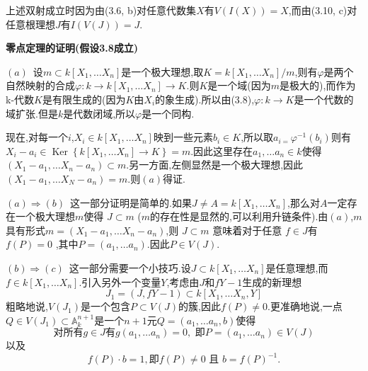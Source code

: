\documentclass[UTF8]{book}
\begin{document}
		
		上述双射成立时因为由(3.6, b)对任意代数集$ X $有$ V(I(X))  = X$,而由(3.10, c)对任意根理想$ J $有$ I(V(J))  = J$.
		
		
		\textbf{零点定理的证明(假设3.8成立)}
		
		
		$ (a) $\ 设$m \subset k \left[ X _{1}, \ldots X _{ n }\right]$是一个极大理想,取$K = k \left[ X _{1}, \ldots X _{ n }\right] / m$,则有$ \varphi $是两个自然映射的合成$ \varphi : k \to k \left[ X _{1}, \ldots X _{ n }\right] \to K$.则$ K $是一个域(因为$ m $是极大的),而作为k-代数$ K $是有限生成的(因为$ K $由$ X_{i} $的象生成).所以由(3.8),$ \varphi : k \to K $是一个代数的域扩张.但是$ k $是代数闭域,所以$ \varphi $是一个同构.
		
		
		现在,对每一个$ i $,$X _{ i } \in k \left[ X _{1}, \ldots X _{ n }\right]$映到一些元素$ b_{i} \in K$,所以取$a _{ i =} \varphi^{-1}\left(b _{ i }\right)$则有$X _{ i }- a _{ i } \in \operatorname{Ker}\left\{ k \left[ X _{1}, \ldots X _{ n }\right] \rightarrow K \right\}= m .$因此这里存在$a _{1}, \ldots a _{ n } \in k$使得$\left(X _{1}- a _{1}, \ldots X _{ n }- a _{ n }\right) \subset m .$另一方面,左侧显然是一个极大理想,因此$\left(X _{1}- a _{1}, \ldots X _{ N }- a _{ n }\right)= m .$则$ (a) $得证.
		
		
		$ (a)  \Rightarrow (b) $\ 这一部分证明是简单的.如果$J \neq A = k \left[ X _{1}, \ldots X _{ n }\right]$,那么对$ A $一定存在一个极大理想$m$使得 $J \subset m$ ($ m $的存在性是显然的,可以利用升链条件).由$ (a) $,$ m $具有形式$m =\left(X _{1}- a _{1}, \ldots X _{ n }- a _{ n }\right)$,则 $J \subset m$ 意味着对于任意 $f \in J$有$f (P )=0$ ,其中$P =\left(a _{1}, \ldots a _{ n }\right) .$因此$P \in V (J )$.
		
		
		$ (b)  \Rightarrow (c) $\ 这一部分需要一个小技巧.设$J \subset k \left[ X _{1}, \ldots X _{ n }\right]$是任意理想,而$f \in k \left[ X _{1}, \ldots X _{ n }\right]$.引入另外一个变量$ Y $,考虑由$ J $和$ fY - 1 $生成的新理想
		\begin{equation*}
		J _{1}=(J , f Y -1) \subset k \left[ X _{1}, \ldots X _{ n }, Y \right]
		\end{equation*}
		粗略地说,$ V(J_{1}) $是一个包含$ P \subset V(J) $的簇,因此$ f(P) \neq 0 $.更准确地说,一点$Q \in V\left(J_{1}\right) \subset \mathbb{A}^{n+1}_{k}$是一个$ n +1 $元$Q =\left(a _{1}, \ldots a _{ n },b \right)$使得
		\begin{equation*}
		\text {对所有} g \in J \text{有}g\left(a_{1}, \dots a_{n}\right)=0 , \text { 即} P=\left(a_{1}, \dots a_{n}\right) \in V(J)
		\end{equation*}
		以及
		\begin{equation*}
		f(P) \cdot b=1, \text {即} f(P) \neq 0 \text { 且 } b=f(P)^{-1}.
		\end{equation*}
		
\end{document}
